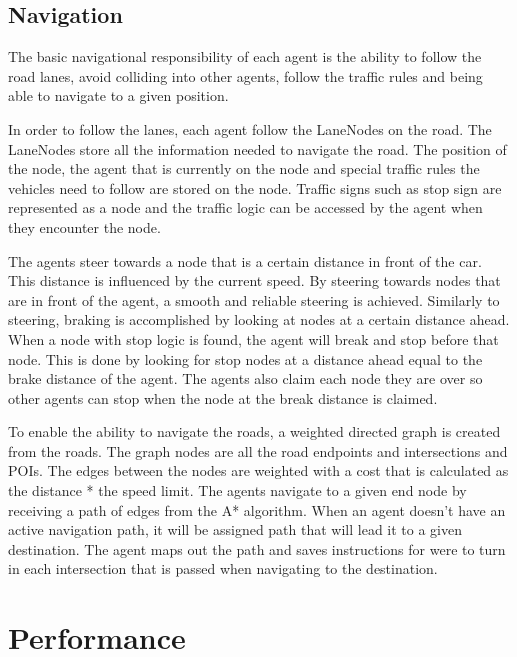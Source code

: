     \subsection{Navigation}
        The basic navigational responsibility of each agent is the ability to follow the road lanes, avoid colliding into other agents, follow the traffic rules and being able to navigate to a given position.
    
        In order to follow the lanes, each agent follow the LaneNodes on the road. The LaneNodes store all the information needed to navigate the road. The position of the node, the agent that is currently on the node and special traffic rules the vehicles need to follow are stored on the node. Traffic signs such as stop sign are represented as a node and the traffic logic can be accessed by the agent when they encounter the node. 
    
        The agents steer towards a node that is a certain distance in front of the car. This distance is influenced by the current speed. By steering towards nodes that are in front of the agent, a smooth and reliable steering is achieved. Similarly to steering, braking is accomplished by looking at nodes at a certain distance ahead. When a node with stop logic is found, the agent will break and stop before that node. This is done by looking for stop nodes at a distance ahead equal to the brake distance of the agent. The agents also claim each node they are over so other agents can stop when the node at the break distance is claimed.                                          
    
        To enable the ability to navigate the roads, a weighted directed graph is created from the roads. The graph nodes are all the road endpoints and intersections and POIs. The edges between the nodes are weighted with a cost that is calculated as the distance * the speed limit. The agents navigate to a given end node by receiving a path of edges from the A* algorithm. When an agent doesn't have an active navigation path, it will be assigned path that will lead it to a given destination. The agent maps out the path and saves instructions for were to turn in each intersection that is passed when navigating to the destination.

\section{Performance}


